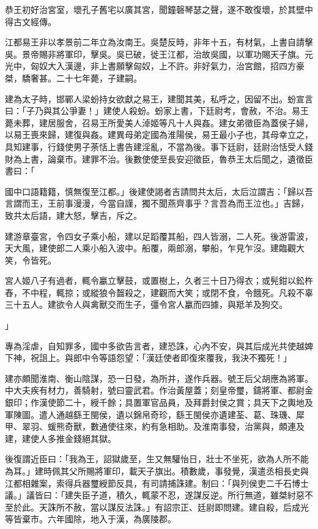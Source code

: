 \begin{pinyinscope}
恭王初好治宮室，壞孔子舊宅以廣其宮，聞鐘磬琴瑟之聲，遂不敢復壞，於其壁中得古文經傳。

江都易王非以孝景前二年立為汝南王。吳楚反時，非年十五，有材氣，上書自請擊吳。景帝賜非將軍印，擊吳。吳已破，徙王江都，治故吳國，以軍功賜天子旗。元光中，匈奴大入漢邊，非上書願擊匈奴，上不許。非好氣力，治宮館，招四方豪桀，驕奢甚。二十七年薨，子建嗣。

建為太子時，邯鄲人梁蚡持女欲獻之易王，建聞其美，私呼之，因留不出。蚡宣言曰：「子乃與其公爭妻！」建使人殺蚡。蚡家上書，下廷尉考，會赦，不治。易王薨未葬，建居服舍，召易王所愛美人淖姬等凡十人與姦。建女弟徵臣為蓋侯子婦，以易王喪來歸，建復與姦。建異母弟定國為淮陽侯，易王最小子也，其母幸立之，具知建事，行錢使男子荼恬上書告建淫亂，不當為後。事下廷尉，廷尉治恬受人錢財為上書，論棄市。建罪不治。後數使使至長安迎徵臣，魯恭王太后聞之，遺徵臣書曰：「

國中口語籍籍，慎無復至江都。」後建使謁者吉請問共太后，太后泣謂吉：「歸以吾言謂而王，王前事漫漫，今當自謹，獨不聞燕齊事乎？言吾為而王泣也。」吉歸，致共太后語，建大怒，擊吉，斥之。

建游章臺宮，令四女子乘小船，建以足蹈覆其船，四人皆溺，二人死。後游雷波，天大風，建使郎二人乘小船入波中。船覆，兩郎溺，攀船，乍見乍沒。建臨觀大笑，令皆死。

宮人姬八子有過者，輒令臝立擊鼓，或置樹上，久者三十日乃得衣；或髡鉗以鈆杵舂，不中程，輒掠；或縱狼令齧殺之，建觀而大笑；或閉不食，令餓死。凡殺不辜三十五人。建欲令人與禽獸交而生子，彊令宮人臝而四據，與羝羊及狗交。

」

專為淫虐，自知罪多，國中多欲告言者，建恐誅，心內不安，與其后成光共使越婢下神，祝詛上。與郎中令等語怨望：「漢廷使者即復來覆我，我決不獨死！」

建亦頗聞淮南、衡山陰謀，恐一日發，為所并，遂作兵器。號王后父胡應為將軍。中大夫疾有材力，善騎射，號曰靈武君。作治黃屋蓋；刻皇帝璽，鑄將軍、都尉金銀印；作漢使節二十，綬千餘；具置軍官品員，及拜爵封侯之賞；具天下之輿地及軍陳圖。遣人通越繇王閩侯，遺以錦帛奇珍，繇王閩侯亦遺建荃、葛、珠璣、犀甲、翠羽、蝯熊奇獸，數通使往來，約有急相助。及淮南事發，治黨與，頗連及建，建使人多推金錢絕其獄。

後復謂近臣曰：「我為王，詔獄歲至，生又無驩怡日，壯士不坐死，欲為人所不能為耳。」建時佩其父所賜將軍印，載天子旗出。積數歲，事發覺，漢遣丞相長史與江都相雜案，索得兵器璽綬節反具，有司請捕誅建。制曰：「與列侯吏二千石博士議。」議皆曰：「建失臣子道，積久，輒蒙不忍，遂謀反逆。所行無道，雖桀紂惡不至於此。天誅所不赦，當以謀反法誅。」有詔宗正、廷尉即問建。建自殺，后成光等皆棄市。六年國除，地入于漢，為廣陵郡。


\end{pinyinscope}

